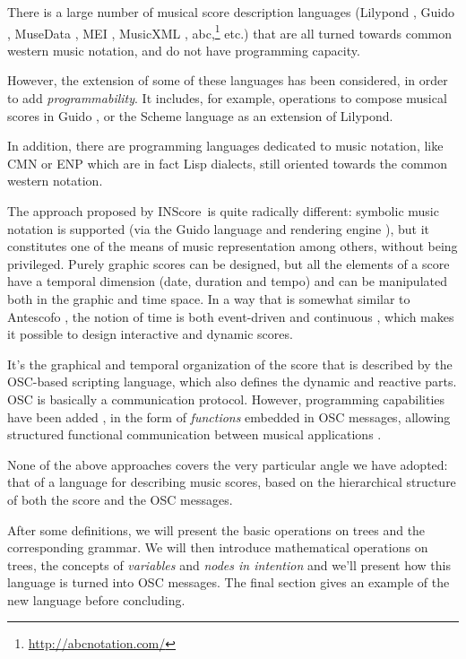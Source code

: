 \documentclass{article}
\newcommand{\IS}		{INScore}
\begin{document}
\vspace{5mm}
There is a large number of musical score description languages (Lilypond \cite{lilypond03}, Guido \cite{hoos98}, MuseData \cite{Hewlett97}, MEI \cite{Roland_2002}, MusicXML \cite{good01}, abc,\footnote{\url{http://abcnotation.com/}} etc.) that are all turned towards common western music notation, and do not have programming capacity. 

However, the extension of some of these languages has been considered, in order to add \textit{programmability}. It includes, for example, operations to compose musical scores in Guido \cite{fober12b}, or the Scheme language as an extension of Lilypond.

In addition, there are programming languages dedicated to music notation, like CMN \cite{Schottstaedt97} or ENP 
\cite{KUUSK06} which are in fact Lisp dialects, still oriented towards the common western notation.

The approach proposed by \IS\ is quite radically different: symbolic music notation is supported (via the Guido language and rendering engine \cite{Dau:09b,hoos98}), but it constitutes one of the means of music representation among others, without being privileged. 
Purely graphic scores can be designed, but all the elements of a score have a temporal dimension (date, duration and tempo) and can be manipulated both in the graphic and time space. In a way that is somewhat similar to Antescofo \cite{acont08}, the notion of time is both event-driven and continuous \cite{fober17c}, which makes it possible to design interactive and dynamic scores.

It's the graphical and temporal organization of the score that is described by the OSC-based scripting language, which also defines the dynamic and reactive parts.
OSC is basically a communication protocol. However, programming capabilities have been added \cite{429}, in the form of \emph{functions} embedded in OSC messages, allowing structured functional communication between musical applications \cite{bresson:hal-01353794}. 

None of the above approaches covers the very particular angle we have adopted: that of a language for describing music scores, based on the hierarchical structure of both the score and the OSC messages.

After some definitions, we will present the basic operations on trees and the corresponding grammar. We will then introduce mathematical operations on trees, the concepts of \emph{variables} and \emph{nodes in intention} and we'll present how this language is turned into OSC messages. The final section gives an example of the new language before concluding.
\end{document}
